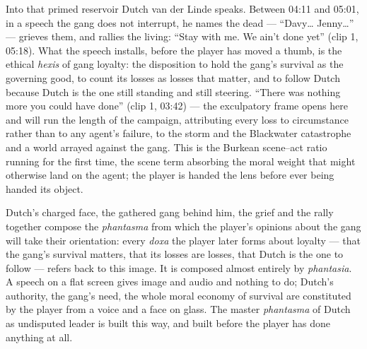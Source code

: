 Into that primed reservoir Dutch van der Linde speaks. Between 04:11 and 05:01, in a speech the gang does not interrupt, he names the dead — ``Davy… Jenny…'' — grieves them, and rallies the living: ``Stay with me. We ain't done yet'' (clip 1, 05:18). What the speech installs, before the player has moved a thumb, is the ethical \textit{hexis} of gang loyalty: the disposition to hold the gang's survival as the governing good, to count its losses as losses that matter, and to follow Dutch because Dutch is the one still standing and still steering. ``There was nothing more you could have done'' (clip 1, 03:42) — the exculpatory frame opens here and will run the length of the campaign, attributing every loss to circumstance rather than to any agent's failure, to the storm and the Blackwater catastrophe and a world arrayed against the gang. This is the Burkean scene–act ratio running for the first time, the scene term absorbing the moral weight that might otherwise land on the agent; the player is handed the lens before ever being handed its object.

Dutch's charged face, the gathered gang behind him, the grief and the rally together compose the \textit{phantasma} from which the player's opinions about the gang will take their orientation: every \textit{doxa} the player later forms about loyalty — that the gang's survival matters, that its losses are losses, that Dutch is the one to follow — refers back to this image. It is composed almost entirely by \textit{phantasia}. A speech on a flat screen gives image and audio and nothing to do; Dutch's authority, the gang's need, the whole moral economy of survival are constituted by the player from a voice and a face on glass. The master \textit{phantasma} of Dutch as undisputed leader is built this way, and built before the player has done anything at all.

